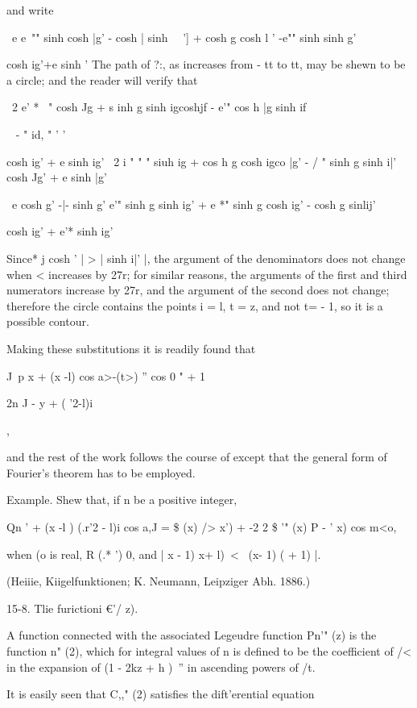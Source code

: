 {{{and write

\ e e~"" sinh cosh |g' - cosh | sinh \ \ '] + cosh g cosh l ' -e""
sinh sinh g'

cosh ig'+e sinh ' The path of ?:, as increases from - tt to tt, may be
shewn to be a circle; and the reader will verify that

\ 2 e' * ~" cosh Jg + s inh g sinh igcoshjf - e'" cos h |g sinh if

 ~ - " id, " ' '

cosh ig' + e sinh ig' \ 2 i " " " siuh ig + cos h g cosh igco |g' - /
" sinh g sinh i|' cosh Jg' + e sinh |g'

\ e cosh g' -|- sinh g' e'" sinh g sinh ig' + e *" sinh g cosh ig' -
cosh g sinlij'

cosh ig' + e'* sinh ig'

%
%

Since* j cosh ' | > | sinh i|' |, the argument of the denominators
does not change when < increases by 27r; for similar reasons, the
arguments of the first and third numerators increase by 27r, and the
argument of the second does not change; therefore the circle contains
the points i = l, t = z, and not t= - 1, so it is a possible contour.

Making these substitutions it is readily found that

J\ p x + (x -l) cos a>-(t>) '' cos 0 " + 1

2n J - y + ( '2-l)i

,

and the rest of the work follows the course of except that the
general form of Fourier's theorem has to be employed.

Example. Shew that, if n be a positive integer,

Qn ' + (x -l ) (.r'2 - l)i cos a,J = \$ (x) /> x') + -2 2 \$ '" (x) P
- ' x) cos m<o,

when (o is real, R (.* ') 0, and | x - 1) x+ l)\ < \ (x- 1) ( + 1) |.

(Heiiie, Kiigelfunktionen; K. Neumann, Leipziger Abh. 1886.)

15-8. Tlie furictioni €'/ z).

A function connected with the associated Legeudre function Pn'" (z) is
the function n" (2), which for integral values of n is defined to be
the coefficient of /< in the expansion of (1 - 2kz + h )~'' in
ascending powers of /t.

It is easily seen that C,," (2) satisfies the dift'erential equation

}}}

